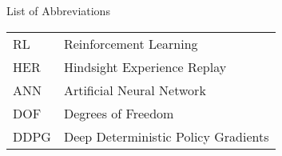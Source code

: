 \clearemptydoublepage
{}
{}

\begin{center}
	\huge{List of Abbreviations}
\end{center}


\vspace{3cm}


\begin{center}
\begin{tabular}{l p{12cm}}
	RL & Reinforcement Learning \\
	HER & Hindsight Experience Replay \\
    ANN & Artificial Neural Network \\
    DOF & Degrees of Freedom \\
    DDPG & Deep Deterministic Policy Gradients
	
\end{tabular}
\end{center}
